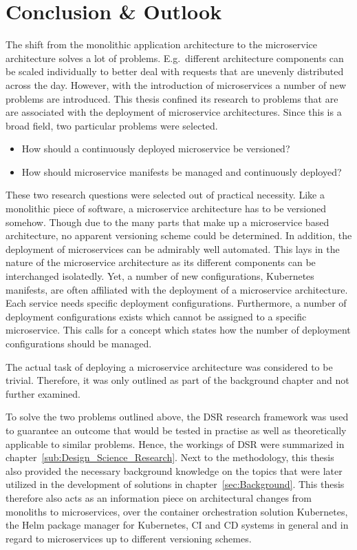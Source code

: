 
\section{Conclusion \& Outlook}%
\label{sec:Conclusion}

The shift from the monolithic application architecture to the microservice
architecture solves a lot of problems. E.g.\ different architecture components
can be scaled individually to better deal with requests that are unevenly
distributed across the day. However, with the introduction of microservices a
number of new problems are introduced. This thesis confined its research to
problems that are are associated with the deployment of microservice
architectures. Since this is a broad field, two particular problems were
selected.

\begin{itemize}
  \item How should a continuously deployed microservice be versioned?
  \item How should microservice manifests be managed and continuously deployed?
\end{itemize}

These two research questions were selected out of practical necessity. Like a
monolithic piece of software, a microservice architecture has to be versioned
somehow. Though due to the many parts that make up a microservice based
architecture, no apparent versioning scheme could be determined. In addition,
the deployment of microservices can be admirably well automated.  This lays in
the nature of the microservice architecture as its different components can be
interchanged isolatedly. Yet, a number of new configurations, Kubernetes
manifests, are often affiliated with the deployment of a microservice
architecture. Each service needs specific deployment configurations.
Furthermore, a number of deployment configurations exists which cannot be
assigned to a specific microservice. This calls for a concept which states how
the number of deployment configurations should be managed.

The actual task of deploying a microservice architecture was considered to be
trivial. Therefore, it was only outlined as part of the background chapter and
not further examined.

To solve the two problems outlined above, the \ac{DSR} research framework was
used to guarantee an outcome that would be tested in practise as well as
theoretically applicable to similar problems. Hence, the workings of \ac{DSR}
were summarized in chapter~\ref{sub:Design_Science_Research}. Next to the
methodology, this thesis also provided the necessary background knowledge on the
topics that were later utilized in the development of solutions in
chapter~\ref{sec:Background}. This thesis therefore also acts as an information
piece on architectural changes from monoliths to microservices, over the
container orchestration solution Kubernetes, the Helm package manager for
Kubernetes, \ac{CI} and \ac{CD} systems in general and in regard to
microservices up to different versioning schemes.

